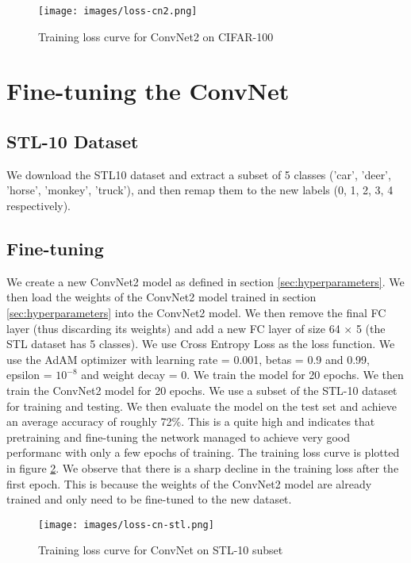 \documentclass{article}
\begin{document}
\begin{figure}[h]
    \centering
    \texttt{[image: images/loss-cn2.png]}
    \caption{Training loss curve for ConvNet2 on CIFAR-100} 
    \label{fig:loss-cn2}
\end{figure}

\section{Fine-tuning the ConvNet}

\subsection{STL-10 Dataset}
We download the STL10 dataset and extract a subset of 5 classes ('car', 'deer', 'horse', 'monkey', 'truck'), and then remap them to the new labels (0, 1, 2, 3, 4 respectively). 

\subsection{Fine-tuning}
We create a new ConvNet2 model as defined in section \ref{sec:hyperparameters}. We then load the weights of the ConvNet2 model trained in section \ref{sec:hyperparameters} into the ConvNet2 model. We then remove the final FC layer (thus discarding its weights) and add a new FC layer of size 64 $\times$ 5 (the STL dataset has 5 classes). We use Cross Entropy Loss as the loss function. We use the AdAM optimizer with learning rate = 0.001, betas = 0.9 and 0.99, epsilon = $10^{-8}$ and weight decay = 0. We train the model for 20 epochs. We then train the ConvNet2 model for 20 epochs. We use a subset of the STL-10 dataset for training and testing. We then evaluate the model on the test set and achieve an average accuracy of roughly 72\%. This is a quite high and indicates that pretraining and fine-tuning the network managed to achieve very good performanc with only a few epochs of training. The training loss curve is plotted in figure \ref{fig:loss-cn-stl}. We observe that there is a sharp decline in the training loss after the first epoch. This is because the weights of the ConvNet2 model are already trained and only need to be fine-tuned to the new dataset.

\begin{figure}[h]
    \centering
    \texttt{[image: images/loss-cn-stl.png]}
    \caption{Training loss curve for ConvNet on STL-10 subset} 
    \label{fig:loss-cn-stl}
\end{figure}
\end{document}
